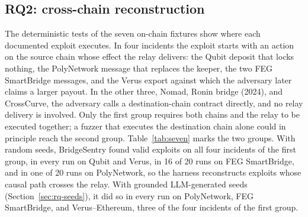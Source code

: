 \documentclass[a4paper]{cas-sc}
\begin{document}
\subsection{RQ2: cross-chain reconstruction}\label{sec:rq-cross}

The deterministic tests of the seven on-chain fixtures show where each documented exploit executes. In four incidents the exploit starts with an action on the source chain whose effect the relay delivers: the Qubit deposit that locks nothing, the PolyNetwork message that replaces the keeper, the two FEG SmartBridge messages, and the Verus export against which the adversary later claims a larger payout. In the other three, Nomad, Ronin bridge (2024), and CrossCurve, the adversary calls a destination-chain contract directly, and no relay delivery is involved. Only the first group requires both chains and the relay to be executed together; a fuzzer that executes the destination chain alone could in principle reach the second group. Table~\ref{tab:seven} marks the two groups. With random seeds, BridgeSentry found valid exploits on all four incidents of the first group, in every run on Qubit and Verus, in 16 of 20 runs on FEG SmartBridge, and in one of 20 runs on PolyNetwork, so the harness reconstructs exploits whose causal path crosses the relay. With grounded LLM-generated seeds (Section~\ref{sec:rq-seeds}), it did so in every run on PolyNetwork, FEG SmartBridge, and Verus--Ethereum, three of the four incidents of the first group.
\end{document}
